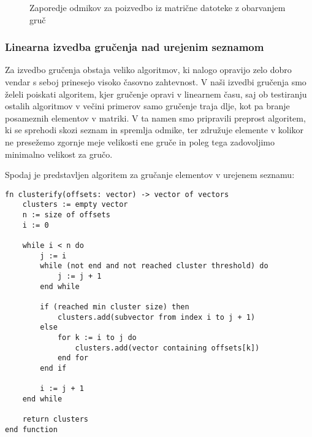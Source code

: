 \documentclass[a4paper,12pt,openright]{book}
\begin{document}
\hfill \break
\begin{figure}[H]
\begin{center}
\caption{Zaporedje odmikov za poizvedbo iz matrične datoteke z obarvanjem gruč}
\end{center}
\end{figure}
        
        \subsubsection{Linearna izvedba gručenja nad urejenim seznamom}
        Za izvedbo gručenja obstaja veliko algoritmov, ki nalogo opravijo zelo dobro vendar s seboj prinesejo visoko časovno zahtevnost. V naši izvedbi gručenja smo želeli poiskati algoritem, kjer gručenje opravi v linearnem času, saj ob testiranju ostalih algoritmov v večini primerov samo gručenje traja dlje, kot pa branje posameznih elementov v matriki. V ta namen smo pripravili preprost algoritem, ki se sprehodi skozi seznam in spremlja odmike, ter združuje elemente v kolikor ne presežemo zgornje meje velikosti ene gruče in poleg tega zadovoljimo minimalno velikost za gručo.

        \newpage
        \noindent
        Spodaj je predstavljen algoritem za gručanje elementov v urejenem seznamu:
        
\begin{verbatim}
fn clusterify(offsets: vector) -> vector of vectors
    clusters := empty vector 
    n := size of offsets
    i := 0

    while i < n do
        j := i
        while (not end and not reached cluster threshold) do
            j := j + 1
        end while
        
        if (reached min cluster size) then
            clusters.add(subvector from index i to j + 1)
        else
            for k := i to j do
                clusters.add(vector containing offsets[k])
            end for
        end if
        
        i := j + 1
    end while

    return clusters
end function
\end{verbatim}
        
\end{document}
